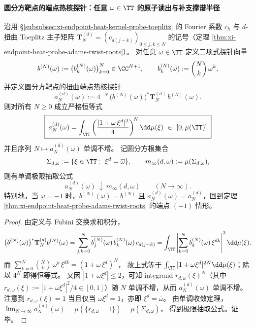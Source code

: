 \paragraph{圆分方靶点的端点热核探针：任意 \texorpdfstring{$\omega\in\TT$}{omega in T} 的原子读出与补支撑谱半径}

\begin{theorem}\label{thm:xi-endpoint-heat-probe-cyclotomic-target-extraction}
沿用 \S\ref{subsubsec:xi-endpoint-heat-kernel-probe-toeplitz} 的 Fourier 系数 \(c_h\) 与 \(d\)-扭曲 Toeplitz 主子矩阵 \(\mathbf{T}_N^{(d)}=(c_{d(j-k)})_{0\le j,k\le N}\) 的记号（定理 \ref{thm:xi-endpoint-heat-probe-adams-twist-roots}）。
对任意 \(\omega\in\TT\) 定义二项式探针向量
\[
b^{(N)}(\omega):=\bigl(b^{(N)}_k(\omega)\bigr)_{k=0}^{N}\in\CC^{N+1},
\qquad
b^{(N)}_k(\omega):=\binom Nk\,\omega^{k},
\]
并定义圆分方靶点的扭曲端点热核探针
\[
a_N^{(d)}(\omega):=4^{-N}\,\bigl(b^{(N)}(\omega)\bigr)^{\ast}\mathbf{T}_N^{(d)}\,b^{(N)}(\omega).
\]
则对所有 \(N\ge 0\) 成立严格恒等式
\[
\boxed{\;
a_N^{(d)}(\omega)
=\int_{\TT}\left(\frac{|1+\omega\,\xi^{d}|^{2}}{4}\right)^{\!N}\dd\mu(\xi)\ \in\ [0,\mu(\TT)]\;}
\]
并且序列 \(N\mapsto a_N^{(d)}(\omega)\) 单调不增。
记圆分方根集合
\[
\Sigma_{d,\omega}:=\{\xi\in\TT:\ \xi^{d}=\overline{\omega}\},
\qquad
m_\infty(d,\omega):=\mu(\Sigma_{d,\omega}),
\]
则有单调极限抽取公式
\[
\boxed{\;
a_N^{(d)}(\omega)\ \downarrow\ m_\infty(d,\omega)\qquad(N\to\infty).\;}
\]
特别地，当 \(\omega=-1\) 时，\(b^{(N)}(\omega)=b^{(N)}\) 且 \(a_N^{(d)}(\omega)=a_N^{(d)}\)，回到定理 \ref{thm:xi-endpoint-heat-probe-adams-twist-roots} 的端点 \((-1)\) 情形。
\end{theorem}
\begin{proof}
由定义与 Fubini 交换求和积分，
\[
\bigl(b^{(N)}(\omega)\bigr)^{\ast}\mathbf{T}_N^{(d)}b^{(N)}(\omega)
=\sum_{j,k=0}^{N}\overline{b_j^{(N)}(\omega)}\,b_k^{(N)}(\omega)\,c_{d(j-k)}
=\int_{\TT}\left|\sum_{k=0}^{N}b_k^{(N)}(\omega)\,\xi^{dk}\right|^{2}\dd\mu(\xi).
\]
而
\(
\sum_{k=0}^{N}\binom Nk\,\omega^{k}\,\xi^{dk}=(1+\omega\,\xi^{d})^{N}
\)，
故上式等于 \(\int_{\TT}|1+\omega\xi^{d}|^{2N}\dd\mu(\xi)\)；除以 \(4^{N}\) 即得恒等式。
又因 \(|1+\omega\xi^{d}|\le 2\)，可知 integrand \(r_{d,\omega}(\xi)^N\)（其中 \(r_{d,\omega}(\xi):=|1+\omega\xi^{d}|^{2}/4\in[0,1]\)）随 \(N\) 单调不增，从而 \(a_N^{(d)}(\omega)\) 单调不增。
注意到 \(r_{d,\omega}(\xi)=1\) 当且仅当 \(\omega\xi^{d}=1\)，亦即 \(\xi^{d}=\overline{\omega}\)。
由单调收敛定理，
\(
\lim_{N\to\infty}a_N^{(d)}(\omega)=\mu(\{r_{d,\omega}=1\})=\mu(\Sigma_{d,\omega})
\)，
得到极限抽取公式。证毕。
\end{proof}

